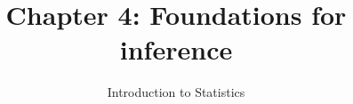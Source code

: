 \documentclass[slidestop,compress,mathserif]{beamer}
\title[Chp 4: Foundations for inference]{Chapter 4: Foundations for inference}
\author{Introduction to Statistics}
\date{}
\institute{}
\begin{document}


\begin{frame}[plain]

\titlepage

\end{frame}










\end{document}
